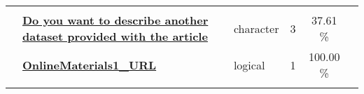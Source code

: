 \documentclass[]{article}
\begin{document}
\begin{longtable}[]{@{}lllrcl@{}}
\begin{minipage}[t]{0.10\columnwidth}
\end{minipage} & \begin{minipage}[t]{0.12\columnwidth}\raggedright\strut
\strut
\end{minipage}\tabularnewline
\begin{minipage}[t]{0.07\columnwidth}\raggedright\strut
\strut
\end{minipage} & \begin{minipage}[t]{0.35\columnwidth}\raggedright\strut
\textbf{\protect\hyperlink{do-you-want-to-describe-another-dataset-provided-with-the-article}{Do
you want to describe another dataset provided with the article}}\strut
\end{minipage} & \begin{minipage}[t]{0.11\columnwidth}\raggedright\strut
character\strut
\end{minipage} & \begin{minipage}[t]{0.10\columnwidth}\raggedleft\strut
3\strut
\end{minipage} & \begin{minipage}[t]{0.10\columnwidth}\centering\strut
37.61 \%\strut
\end{minipage} & \begin{minipage}[t]{0.12\columnwidth}\raggedright\strut
\strut
\end{minipage}\tabularnewline
\begin{minipage}[t]{0.07\columnwidth}\raggedright\strut
\strut
\end{minipage} & \begin{minipage}[t]{0.35\columnwidth}\raggedright\strut
\textbf{\protect\hyperlink{onlinematerials1_url}{OnlineMaterials1\_URL}}\strut
\end{minipage} & \begin{minipage}[t]{0.11\columnwidth}\raggedright\strut
logical\strut
\end{minipage} & \begin{minipage}[t]{0.10\columnwidth}\raggedleft\strut
1\strut
\end{minipage} & \begin{minipage}[t]{0.10\columnwidth}\centering\strut
100.00 \%\strut
\end{minipage} & \begin{minipage}[t]{0.12\columnwidth}\raggedright\strut
\strut
\end{minipage}\tabularnewline
\begin{minipage}[t]{0.07\columnwidth}\raggedright\strut
\strut
\end{minipage} & \begin{minipage}[t]{0.35\columnwidth}\raggedright\strut

\end{minipage}
\end{longtable}
\end{document}
